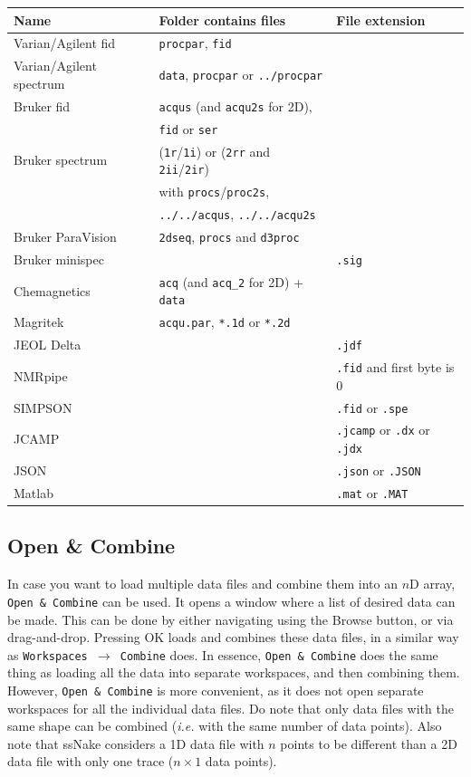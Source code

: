 \documentclass[11pt,a4paper]{article}
\begin{document}
\begin{center}
\begin{tabular}{lll}
\toprule
Name & Folder contains files & File extension\\
\midrule
\rowcolor{gray!30!white}
Varian/Agilent fid &  \texttt{procpar}, \texttt{fid} & \\
Varian/Agilent spectrum&  \texttt{data}, \texttt{procpar} or \texttt{../procpar} & \\
\rowcolor{gray!30!white}
Bruker fid &  \texttt{acqus} (and \texttt{acqu2s} for 2D),  &\\
\rowcolor{gray!30!white}
&\texttt{fid} or \texttt{ser}&\\
Bruker spectrum & (\texttt{1r}/\texttt{1i}) or (\texttt{2rr} and \texttt{2ii}/\texttt{2ir}) &\\
  & with \texttt{procs}/\texttt{proc2s},&\\
 &\texttt{../../acqus}, \texttt{../../acqu2s} & \\
\rowcolor{gray!30!white}
Bruker ParaVision & \texttt{2dseq}, \texttt{procs} and \texttt{d3proc} &\\
Bruker minispec &  & \texttt{.sig} \\
\rowcolor{gray!30!white}
Chemagnetics &  \texttt{acq} (and \texttt{acq\_2} for 2D) + \texttt{data} &\\
Magritek &  \texttt{acqu.par}, \texttt{*.1d} or \texttt{*.2d}&\\
\rowcolor{gray!30!white}
JEOL Delta & & \texttt{.jdf}\\
NMRpipe & & \texttt{.fid} and first byte is 0\\
\rowcolor{gray!30!white}
SIMPSON &  & \texttt{.fid} or \texttt{.spe} \\
JCAMP & & \texttt{.jcamp} or \texttt{.dx} or \texttt{.jdx}\\
\rowcolor{gray!30!white}
JSON & & \texttt{.json} or \texttt{.JSON}\\
Matlab & & \texttt{.mat} or \texttt{.MAT}\\
\bottomrule
\end{tabular}
\end{center}


\subsection{Open \& Combine}
In case you want to load multiple data files and combine them into an $n$D array, \texttt{Open~\&~Combine} can be used. It opens a window where a list of desired data can be made. This can be done by either navigating using the Browse button, or via drag-and-drop. Pressing OK loads and combines these data files, in a similar way as \texttt{Workspaces~$\rightarrow$~Combine} does. In essence, \texttt{Open~\&~Combine} does the same thing as loading all the data into separate workspaces, and then combining them. However, \texttt{Open~\&~Combine} is more convenient, as it does not open separate workspaces for all the individual data files. Do note that only data files with the same shape can be combined (\textit{i.e.} with the same number of data points). Also note that ssNake considers a 1D data file with $n$ points to be different than a 2D data file with only one trace ($n\times1$ data points).
\end{document}
